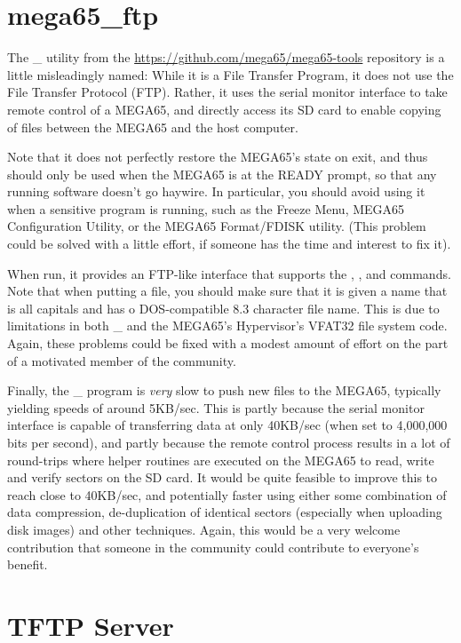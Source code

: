 \section{mega65\_ftp}

The \_ utility from
the \url{https://github.com/mega65/mega65-tools} repository is a
little misleadingly named: While it 
is a File Transfer Program, it does not use the File Transfer
Protocol (FTP).  Rather, it uses the serial monitor interface to take
remote control of a MEGA65, and directly access its SD card to enable
copying of files between the MEGA65 and the host computer.

Note that it does not perfectly restore the MEGA65's state on exit,
and thus should only be used when the MEGA65 is at the READY prompt,
so that any running software doesn't go haywire. In particular, you
should avoid using it when a sensitive program is running, such as
the Freeze Menu, MEGA65 Configuration Utility, or the MEGA65
Format/FDISK utility.  (This problem could be solved with a little
effort, if someone has the time and interest to fix it).

When run, it provides an FTP-like interface that supports
the , ,  and  commands.
Note that when putting a file, you should make sure that it is given a
name that is all capitals and has o DOS-compatible 8.3 character file
name.  This is due to limitations in both \_ and the
MEGA65's Hypervisor's VFAT32 file system code. Again, these problems
could be fixed with a modest amount of effort on the part of a
motivated member of the community.

Finally, the \_ program is {\em very} slow to push
new files to the MEGA65, typically yielding speeds of around 5KB/sec.
This is partly because the serial monitor interface is capable of
transferring data at only 40KB/sec (when set to 4,000,000 bits per
second), and partly because the remote control process results in a
lot of round-trips where helper routines are executed on the MEGA65 to
read, write and verify sectors on the SD card.  It would be quite
feasible to improve this to reach close to 40KB/sec, and potentially
faster using either some combination of data compression,
de-duplication of identical sectors (especially when uploading disk
images) and other techniques. Again, this would be a very welcome
contribution that someone in the community could contribute to
everyone's benefit.

\section{TFTP Server}


